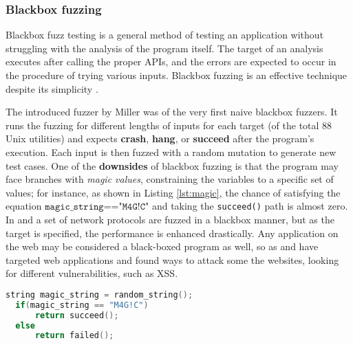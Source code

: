 \subsubsection{Blackbox fuzzing}

Blackbox fuzz testing is a general method of testing an application without struggling with the analysis of the program itself. The target of an analysis executes after calling the proper APIs, and the errors are expected to occur in the procedure of trying various inputs. Blackbox fuzzing is an effective technique despite its simplicity \cite{woo2013scheduling}.

The introduced fuzzer by Miller \cite{miller1990empirical} was of the very first naive blackbox fuzzers. It runs the fuzzing for different lengths of inputs for each target (of the total 88 Unix utilities) and expects \textbf{crash}, \textbf{hang}, or \textbf{succeed} after the program's execution. Each input is then fuzzed with a random mutation to generate new test cases. One of the \textbf{downsides} of blackbox fuzzing is that the program may face branches with \textit{magic values}, constraining the variables to a specific set of values; for instance, as shown in Listing \ref{lst:magic}, the chance of satisfying the equation $\texttt{magic\_string=="M4G!C"}$ and taking the \texttt{succeed()} path is almost zero. In \cite{banks2006snooze} and \cite{gascon2015pulsar} a set of network protocols are fuzzed in a blackbox manner, but as the target is specified, the performance is enhanced drastically. Any application on the web may be considered a black-boxed program as well, so as \cite{doupe2012enemy} and \cite{duchene2012xss} have targeted web applications and found ways to attack some the websites, looking for different vulnerabilities, such as XSS.

\begin{lstlisting}[language=C++,style=CodeStyle,caption=Magic Value: \texttt{M4G!C} is a magic value,label={lst:magic}]
  string magic_string = random_string();
  if(magic_string == "M4G!C")
      return succeed();
  else
      return failed();
\end{lstlisting}

